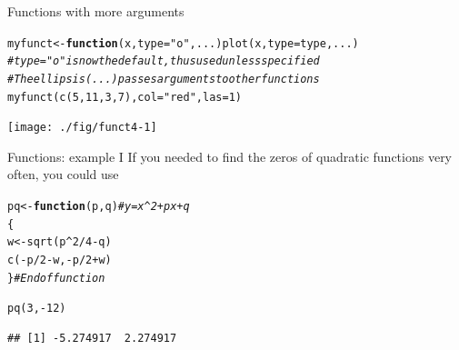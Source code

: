 \documentclass[xcolor=table,       handout,    xcolor=dvipsnames]{beamer}\usepackage[]{graphicx}\usepackage[]{color}
\makeatletter
\newcommand{\hlnum}[1]{\textcolor[rgb]{0,0,0}{#1}}
\newcommand{\hlstr}[1]{\textcolor[rgb]{0.545,0.137,0.137}{#1}}
\newcommand{\hlcom}[1]{\textcolor[rgb]{0,0.392,0}{\textit{#1}}}
\newcommand{\hlopt}[1]{\textcolor[rgb]{0,0,0}{#1}}
\newcommand{\hlstd}[1]{\textcolor[rgb]{0,0,0}{#1}}
\newcommand{\hlkwa}[1]{\textcolor[rgb]{1,0,0}{\textbf{#1}}}
\newcommand{\hlkwb}[1]{\textcolor[rgb]{0,0,0}{#1}}
\newcommand{\hlkwc}[1]{\textcolor[rgb]{1,0,1}{#1}}
\newcommand{\hlkwd}[1]{\textcolor[rgb]{0,0,1}{#1}}
\newenvironment{kframe}{%
 \def\at@end@of@kframe{}%
 \ifinner\ifhmode%
  \def\at@end@of@kframe{\end{minipage}}%
  \begin{minipage}{\columnwidth}%
 \fi\fi%
 \def\FrameCommand##1{\hskip\@totalleftmargin \hskip-\fboxsep
 \colorbox{shadecolor}{##1}\hskip-\fboxsep
     \hskip-\linewidth \hskip-\@totalleftmargin \hskip\columnwidth}%
 \MakeFramed {\advance\hsize-\width
   \@totalleftmargin\z@ \linewidth\hsize
   \@setminipage}}%
 {\par\unskip\endMakeFramed%
 \at@end@of@kframe}
\newenvironment{knitrout}{}{} %
\makeatother
\begin{document}

\begin{frame}[fragile]{Functions with more arguments}
\begin{knitrout}\small
{}\color{fgcolor}\begin{kframe}
\begin{alltt}
\hlstd{myfunct} \hlkwb{<-} \hlkwa{function}\hlstd{(}\hlkwc{x}\hlstd{,} \hlkwc{type}\hlstd{=}\hlstr{"o"}\hlstd{,} \hlkwc{...}\hlstd{)} \hlkwd{plot}\hlstd{(x,} \hlkwc{type}\hlstd{=type, ...)}
\hlcom{# type="o" is now the default, thus used unless specified}
\hlcom{# The ellipsis (...) passes arguments to other functions}
\hlkwd{myfunct}\hlstd{(}  \hlkwd{c}\hlstd{(}\hlnum{5}\hlstd{,}\hlnum{11}\hlstd{,}\hlnum{3}\hlstd{,}\hlnum{7}\hlstd{) ,} \hlkwc{col}\hlstd{=}\hlstr{"red"}\hlstd{,} \hlkwc{las}\hlstd{=}\hlnum{1}\hlstd{)}
\end{alltt}
\end{kframe}

{\centering \texttt{[image: ./fig/funct4-1]} 

}



\end{knitrout}
\vspace{-2em}
\end{frame}


\begin{frame}[fragile]{Functions: example I}
If you needed to find the zeros of quadratic functions very often, you could use
\begin{knitrout}
\color{fgcolor}\begin{kframe}
\begin{alltt}
\hlstd{pq} \hlkwb{<-} \hlkwa{function}\hlstd{(}\hlkwc{p}\hlstd{,}\hlkwc{q}\hlstd{)} \hlcom{# y = x^2 + px + q}
              \hlstd{\{}
              \hlstd{w} \hlkwb{<-} \hlkwd{sqrt}\hlstd{( p}\hlopt{^}\hlnum{2} \hlopt{/} \hlnum{4} \hlopt{-} \hlstd{q )}
              \hlkwd{c}\hlstd{(}\hlopt{-}\hlstd{p}\hlopt{/}\hlnum{2}\hlopt{-}\hlstd{w,} \hlopt{-}\hlstd{p}\hlopt{/}\hlnum{2}\hlopt{+}\hlstd{w)}
              \hlstd{\}} \hlcom{# End of function}

\hlkwd{pq}\hlstd{(}\hlnum{3}\hlstd{,} \hlopt{-}\hlnum{12}\hlstd{)}
\end{alltt}
\begin{verbatim}
## [1] -5.274917  2.274917
\end{verbatim}
\end{kframe}
\end{knitrout}
\end{frame}
\end{document}
